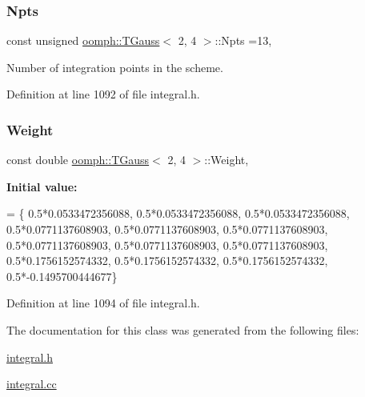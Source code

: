 \subsubsection{\texorpdfstring{Npts}{Npts}}
{\footnotesize\ttfamily const unsigned \hyperlink{classoomph_1_1TGauss}{oomph\+::\+T\+Gauss}$<$ 2, 4 $>$\+::Npts =13\hspace{0.3cm}{\ttfamily [static]}, {\ttfamily [private]}}



Number of integration points in the scheme. 



Definition at line 1092 of file integral.\+h.

\mbox{\label{classoomph_1_1TGauss_3_012_00_014_01_4_ad68f6698c9fd4fc05e6878cba10c57b3}} 
\subsubsection{\texorpdfstring{Weight}{Weight}}
{\footnotesize\ttfamily const double \hyperlink{classoomph_1_1TGauss}{oomph\+::\+T\+Gauss}$<$ 2, 4 $>$\+::Weight\hspace{0.3cm}{\ttfamily [static]}, {\ttfamily [private]}}

{\bfseries Initial value\+:}
\begin{DoxyCode}
= \{
0.5*0.0533472356088,
0.5*0.0533472356088,
0.5*0.0533472356088,
0.5*0.0771137608903,
0.5*0.0771137608903,
0.5*0.0771137608903,
0.5*0.0771137608903,
0.5*0.0771137608903,
0.5*0.0771137608903,
0.5*0.1756152574332,
0.5*0.1756152574332,
0.5*0.1756152574332,
0.5*-0.1495700444677\}
\end{DoxyCode}


Definition at line 1094 of file integral.\+h.



The documentation for this class was generated from the following files\+:\begin{DoxyCompactItemize}
\item 
\hyperlink{integral_8h}{integral.\+h}\item 
\hyperlink{integral_8cc}{integral.\+cc}\end{DoxyCompactItemize}
